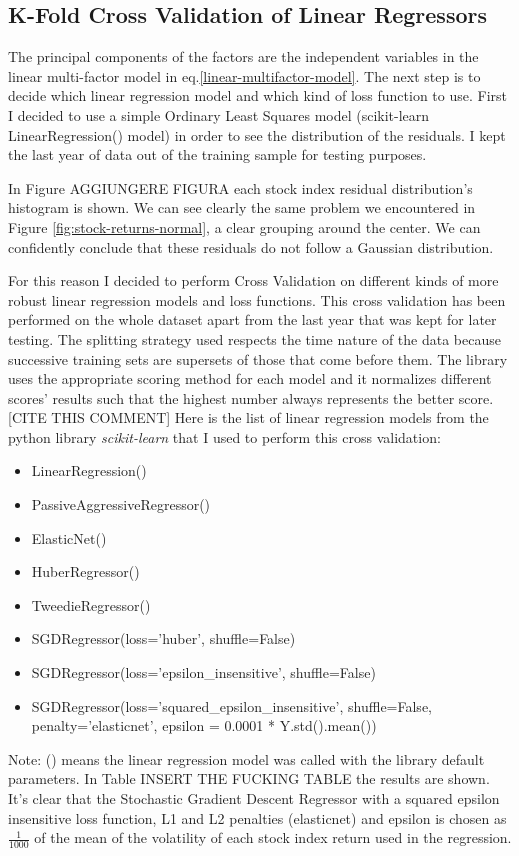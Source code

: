 \subsection{K-Fold Cross Validation of Linear Regressors}
The principal components of the factors are the independent variables in the linear multi-factor model in eq.\eqref{linear-multifactor-model}. The next step is to decide which linear regression model and which kind of loss function to use.
First I decided to use a simple Ordinary Least Squares model (scikit-learn LinearRegression() model) in order to see the distribution of the residuals. I kept the last year of data out of the training sample for testing purposes.

In Figure AGGIUNGERE FIGURA each stock index residual distribution's histogram is shown. We can see clearly the same problem we encountered in Figure \ref{fig:stock-returns-normal}, a clear grouping around the center. We can confidently conclude that these residuals do not follow a Gaussian distribution.

For this reason I decided to perform Cross Validation on different kinds of more robust linear regression models and loss functions. This cross validation has been performed on the whole dataset apart from the last year that was kept for later testing. The splitting strategy used respects the time nature of the data because successive training sets are supersets of those that come before them.
The library uses the appropriate scoring method for each model and it normalizes different scores' results such that the highest number always represents the better score. [CITE THIS COMMENT]
Here is the list of linear regression models from the python library \textit{scikit-learn} that I used to perform this cross validation:
\begin{itemize}
	\item LinearRegression()
	\item PassiveAggressiveRegressor()
	\item ElasticNet()
	\item HuberRegressor()
	\item TweedieRegressor()
	\item SGDRegressor(loss='huber', shuffle=False)
	\item SGDRegressor(loss='epsilon\_insensitive', shuffle=False)
	\item SGDRegressor(loss='squared\_epsilon\_insensitive', shuffle=False, penalty='elasticnet', epsilon = 0.0001 * Y.std().mean())
\end{itemize}
Note: () means the linear regression model was called with the library default parameters.
In Table INSERT THE FUCKING TABLE the results are shown. It's clear that the Stochastic Gradient Descent Regressor with a squared epsilon insensitive loss function, L1 and L2 penalties (elasticnet) and epsilon is chosen as $\frac{1}{1000}$ of the mean of the volatility of each stock index return used in the regression.

